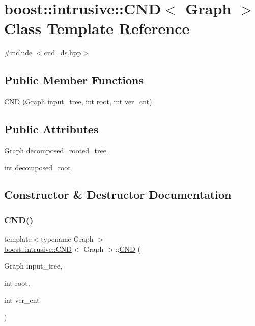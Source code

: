 \hypertarget{classboost_1_1intrusive_1_1CND}{}\section{boost\+:\+:intrusive\+:\+:C\+ND$<$ Graph $>$ Class Template Reference}
\label{classboost_1_1intrusive_1_1CND}


{\ttfamily \#include $<$cnd\+\_\+ds.\+hpp$>$}

\subsection*{Public Member Functions}
\begin{DoxyCompactItemize}
\item 
\hyperlink{classboost_1_1intrusive_1_1CND_a64cac05d77acc3287a1eea532d11e791}{C\+ND} (Graph input\+\_\+tree, int root, int ver\+\_\+cnt)
\end{DoxyCompactItemize}
\subsection*{Public Attributes}
\begin{DoxyCompactItemize}
\item 
Graph \hyperlink{classboost_1_1intrusive_1_1CND_ab89e0135816b15eda77a307fda40d472}{decomposed\+\_\+rooted\+\_\+tree}
\item 
int \hyperlink{classboost_1_1intrusive_1_1CND_a3219b3d68c52b7dfcaac88f40e96d373}{decomposed\+\_\+root}
\end{DoxyCompactItemize}


\subsection{Constructor \& Destructor Documentation}
\mbox{\label{classboost_1_1intrusive_1_1CND_a64cac05d77acc3287a1eea532d11e791}} 
\subsubsection{\texorpdfstring{C\+N\+D()}{CND()}}
{\footnotesize\ttfamily template$<$typename Graph $>$ \\
\hyperlink{classboost_1_1intrusive_1_1CND}{boost\+::intrusive\+::\+C\+ND}$<$ Graph $>$\+::\hyperlink{classboost_1_1intrusive_1_1CND}{C\+ND} (\begin{DoxyParamCaption}\item[{Graph}]{input\+\_\+tree,  }\item[{int}]{root,  }\item[{int}]{ver\+\_\+cnt }\end{DoxyParamCaption})\hspace{0.3cm}{\ttfamily [inline]}}


